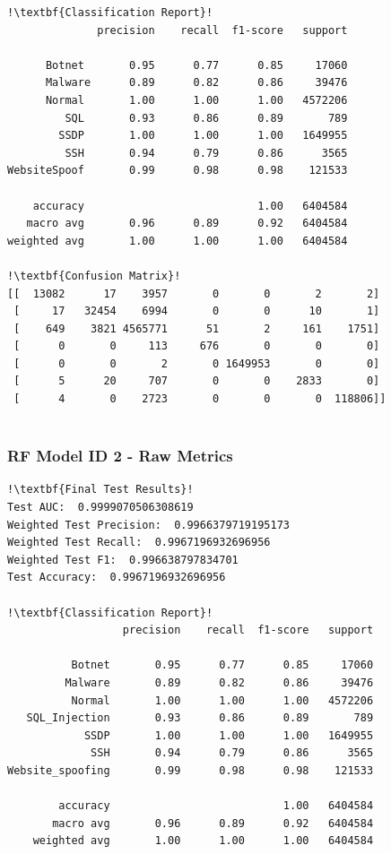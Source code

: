 \begin{appendices}
\begin{lstlisting}[escapechar=!]
!\textbf{Classification Report}!
			  precision    recall  f1-score   support

      Botnet       0.95      0.77      0.85     17060
      Malware      0.89      0.82      0.86     39476
      Normal       1.00      1.00      1.00   4572206
         SQL       0.93      0.86      0.89       789
        SSDP       1.00      1.00      1.00   1649955
         SSH       0.94      0.79      0.86      3565
WebsiteSpoof       0.99      0.98      0.98    121533

    accuracy                           1.00   6404584
   macro avg       0.96      0.89      0.92   6404584
weighted avg       1.00      1.00      1.00   6404584
    
!\textbf{Confusion Matrix}!    
[[  13082      17    3957       0       0       2       2]
 [     17   32454    6994       0       0      10       1]
 [    649    3821 4565771      51       2     161    1751]
 [      0       0     113     676       0       0       0]
 [      0       0       2       0 1649953       0       0]
 [      5      20     707       0       0    2833       0]
 [      4       0    2723       0       0       0  118806]]
 
\end{lstlisting}

\newpage
\subsubsection{RF Model ID 2 - Raw Metrics}
\begin{lstlisting}[escapechar=!]
!\textbf{Final Test Results}!
Test AUC:  0.9999070506308619
Weighted Test Precision:  0.9966379719195173
Weighted Test Recall:  0.9967196932696956
Weighted Test F1:  0.996638797834701
Test Accuracy:  0.9967196932696956

!\textbf{Classification Report}!
				  precision    recall  f1-score   support

          Botnet       0.95      0.77      0.85     17060
         Malware       0.89      0.82      0.86     39476
          Normal       1.00      1.00      1.00   4572206
   SQL_Injection       0.93      0.86      0.89       789
            SSDP       1.00      1.00      1.00   1649955
             SSH       0.94      0.79      0.86      3565
Website_spoofing       0.99      0.98      0.98    121533

        accuracy                           1.00   6404584
       macro avg       0.96      0.89      0.92   6404584
    weighted avg       1.00      1.00      1.00   6404584
    

\end{lstlisting}
\end{appendices}
